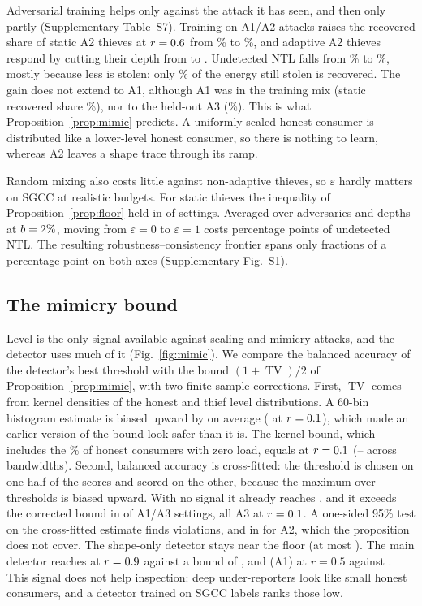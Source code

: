 \documentclass[journal]{IEEEtran}
\DeclareMathOperator{\TV}{TV}
\begin{document}
Adversarial training helps only against the attack it has seen, and then only partly (Supplementary Table~S7). Training on A1/A2 attacks raises the recovered share of static A2 thieves at $r=0.6$ from \rStatRecLevelTwo\% to \rStatRecAdvTwo\%, and adaptive A2 thieves respond by cutting their depth from \rAdaptRLevelTwo{} to \rAdaptRAdvTwo{}. Undetected NTL falls from \rAdaptNtlLevelTwo\% to \rAdaptNtlAdvTwo\%, mostly because less is stolen: only \rAdaptRecAdvTwo\% of the energy still stolen is recovered. The gain does not extend to A1, although A1 was in the training mix (static recovered share \rStatRecAdvOne\%), nor to the held-out A3 (\rStatRecAdvThree\%). This is what Proposition~\ref{prop:mimic} predicts. A uniformly scaled honest consumer is distributed like a lower-level honest consumer, so there is nothing to learn, whereas A2 leaves a shape trace through its ramp.

Random mixing also costs little against non-adaptive thieves, so $\varepsilon$ hardly matters on SGCC at realistic budgets. For static thieves the inequality of Proposition~\ref{prop:floor} held in \rPropTwoOk{} of \rPropTwoN{} settings. Averaged over adversaries and depths at $b=2\%$, moving from $\varepsilon=0$ to $\varepsilon=1$ costs \rConsistCost{} percentage points of undetected NTL. The resulting robustness--consistency frontier spans only fractions of a percentage point on both axes (Supplementary Fig.~S1).

\subsection{The mimicry bound}\label{sec:res-mimic}
Level is the only signal available against scaling and mimicry attacks, and the detector uses much of it (Fig.~\ref{fig:mimic}). We compare the balanced accuracy of the detector's best threshold with the bound $(1+\TV)/2$ of Proposition~\ref{prop:mimic}, with two finite-sample corrections. First, $\TV$ comes from kernel densities of the honest and thief level distributions. A 60-bin histogram estimate is biased upward by \rMimicTvGap{} on average (\rMimicTvGapSmall{} at $r=0.1$), which made an earlier version of the bound look safer than it is. The kernel bound, which includes the \rZeroLoadHonest\% of honest consumers with zero load, equals \rBoundSmallR{} at $r=0.1$ (\rBoundSmallRLo{}--\rBoundSmallRHi{} across bandwidths). Second, balanced accuracy is cross-fitted: the threshold is chosen on one half of the scores and scored on the other, because the maximum over thresholds is biased upward. With no signal it already reaches \rMimicNullBA{}, and it exceeds the corrected bound in \rMimicViolNaive{} of \rMimicN{} A1/A3 settings, all A3 at $r=0.1$. A one-sided 95\% test on the cross-fitted estimate finds \rMimicViol{} violations, and \rMimicViolTwo{} in \rMimicNTwo{} for A2, which the proposition does not cover. The shape-only detector stays near the floor (at most \rBalAccShapeMax{}). The main detector reaches \rBalAccLevelMax{} at $r=0.9$ against a bound of \rBoundMax{}, and \rBalAccAtMidOne{} (A1) at $r=0.5$ against \rBoundAtMid{}. This signal does not help inspection: deep under-reporters look like small honest consumers, and a detector trained on SGCC labels ranks those low.
\end{document}
